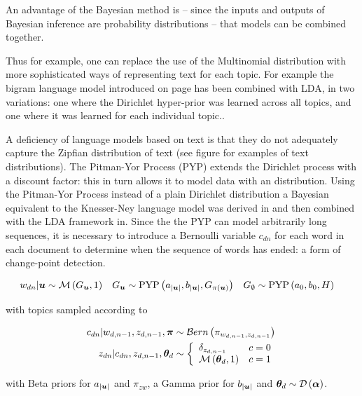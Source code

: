 An advantage of the Bayesian method is -- since the inputs and outputs of Bayesian inference are probability distributions -- that models can be combined together.

Thus for example, one can replace the use of the Multinomial distribution with more sophisticated ways of representing text for each topic. For example the bigram language model introduced on page \pageref{sec:chap1:mackay-lang-model} has been combined with LDA\cite{Wallach2006}, in two variations: one where the Dirichlet hyper-prior was learned across all topics, and one where it was learned for each individual topic..

A deficiency of language models based on text is that they do not adequately capture the Zipfian distribution of text (see figure for examples of text distributions). The Pitman-Yor Process (PYP) extends the Dirichlet process with a discount factor: this in turn allows it to model data with an  distribution. Using the Pitman-Yor Process instead of a plain Dirichlet distribution a Bayesian equivalent to the Knesser-Ney language model was derived in\cite{Teh2002} and then combined with the LDA framework in\cite{Lindsey2012}. Since the the PYP can model arbitrarily long sequences, it is necessary to introduce a Bernoulli variable $c_{dn}$ for each word in each document to determine when the sequence of words has ended: a form of change-point detection. 

\begin{align}
w_{dn} | \bm u &\sim \mathcal{M} \left( {G_{\bm u}},{1} \right) &
G_{\bm u} &\sim \text{PYP}\left( a_{|\bm u|}, b_{|\bm u|}, G_{\pi(\bm u)} \right) &
G_{\emptyset} &\sim \text{PYP}\left( a_{0}, b_{0}, H \right)
\end{align}

with topics sampled according to

\begin{align}
c_{dn} | w_{d,n-1}, z_{d,n-1}, \bm \pi &\sim \mathcal{B}ern \left(\pi_{ w_{d,n-1}, z_{d,n-1}}\right) \\
z_{dn} | c_{dn}, z_{d,n-1}, { \bm \theta_d } & \sim \left\{ \begin{array}{lr}
     \delta_{z_{d,n - 1}} & c = 0 \\
     \mathcal{M} \left( {{ \bm \theta_d }},{1} \right) & c = 1
 \end{array}\right.
\end{align}

with Beta priors for $a_{|\bm u|}$ and $\pi_{zw}$, a Gamma prior for  $b_{|\bm u|}$ and ${ \bm \theta_d } \sim \mathcal{D} \left( {\bm \alpha} \right)$.

